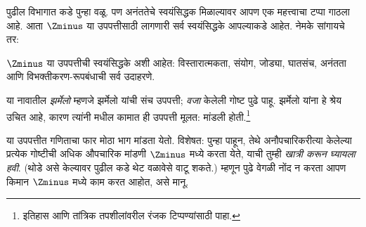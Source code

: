 \documentclass[../../../include/open-logic-section]{subfiles}
\begin{document}

पुढील विभागात \stagesinf{} कडे पुन्हा वळू. पण अनंततेचे स्वयंसिद्धक मिळाल्यावर आपण एक महत्त्वाचा टप्पा गाठला आहे. आता $\Zminus$ या उपपत्तीसाठी लागणारी सर्व स्वयंसिद्धके आपल्याकडे आहेत. नेमके सांगायचे तर:

\begin{defn}
$\Zminus$ या उपपत्तीची स्वयंसिद्धके अशी आहेत: विस्तारात्मकता, संयोग, जोड्या, घातसंच, अनंतता आणि विभक्तीकरण-रूपबंधाची सर्व उदाहरणे.
\end{defn}

या नावातील \emph{झर्मेलो} म्हणजे झर्मेलो यांची संच उपपत्ती; \emph{वजा} केलेली गोष्ट पुढे पाहू. झर्मेलो यांना हे श्रेय उचित आहे, कारण त्यांनी \citeyear{Zermelo1908Untersuchungen} मधील कामात ही उपपत्ती मूलत: मांडली होती.\footnote{इतिहास आणि तांत्रिक तपशीलांवरील रंजक टिप्पण्यांसाठी \citet[Appendix
A]{Potter2004} पाहा.}

या उपपत्तीत गणिताचा फार मोठा भाग मांडता येतो. विशेषत:  पुन्हा पाहून, तेथे अनौपचारिकरीत्या केलेल्या प्रत्येक गोष्टीची अधिक औपचारिक मांडणी $\Zminus$ मध्ये करता येते, याची तुम्ही \emph{खात्री करून घ्यायला हवी}. (थोडे असे केल्यावर पुढील  कडे थेट वळावेसे वाटू शकते.) म्हणून पुढे वेगळी नोंद न करता आपण किमान $\Zminus$ मध्ये काम करत आहोत, असे मानू.
\end{document}
